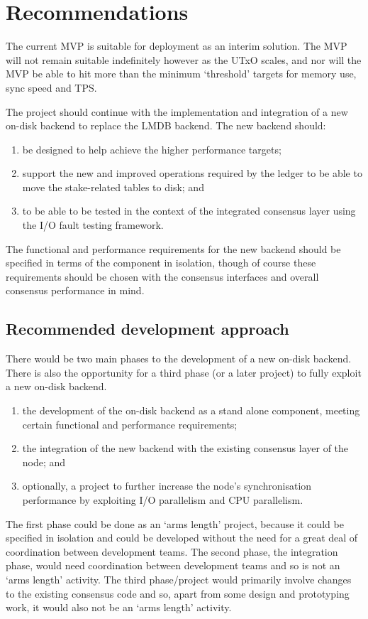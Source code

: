\documentclass[11pt,a4paper]{article}
\begin{document}
\section{Recommendations}

The current MVP is suitable for deployment as an interim solution. The MVP
will not remain suitable indefinitely however as the UTxO scales, and nor will
the MVP be able to hit more than the minimum `threshold' targets for memory
use, sync speed and TPS.

The project should continue with the implementation and integration of a new
on-disk backend to replace the LMDB backend. The new backend should:
\begin{enumerate}
\item be designed to help achieve the higher performance targets;
\item support the new and improved operations required by the ledger to be able
      to move the stake-related tables to disk; and
\item to be able to be tested in the context of the integrated consensus layer
      using the I/O fault testing framework.
\end{enumerate}

The functional and performance requirements for the new backend should be
specified in terms of the component in isolation, though of course these
requirements should be chosen with the consensus interfaces and overall
consensus performance in mind.

\subsection{Recommended development approach}

There would be two main phases to the development of a new on-disk backend.
There is also the opportunity for a third phase (or a later project) to fully
exploit a new on-disk backend.
\begin{enumerate}
\item the development of the on-disk backend as a stand alone component,
      meeting certain functional and performance requirements;
\item the integration of the new backend with the existing consensus layer of
      the node; and
\item optionally, a project to further increase the node's synchronisation
      performance by exploiting I/O parallelism and CPU parallelism.
\end{enumerate}
The first phase could be done as an `arms length' project, because it could be
specified in isolation and could be developed without the need for a great deal
of coordination between development teams. The second phase, the integration
phase, would need coordination between development teams and so is not an
`arms length' activity. The third phase/project would primarily involve changes
to the existing consensus code and so, apart from some design and prototyping
work, it would also not be an `arms length' activity.
\end{document}

